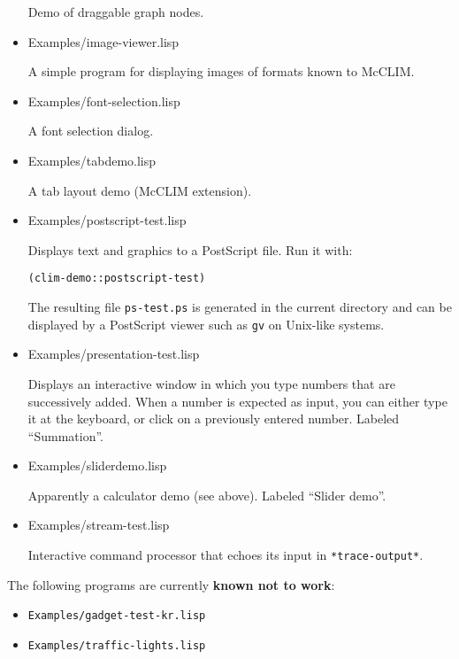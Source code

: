 \begin{itemize}
  Demo of draggable graph nodes.

\item Examples/image-viewer.lisp

  A simple program for displaying images of formats known to McCLIM.

\item Examples/font-selection.lisp

  A font selection dialog.

\item Examples/tabdemo.lisp

  A tab layout demo (McCLIM extension).

\item Examples/postscript-test.lisp

  Displays text and graphics to a PostScript file.  Run it with:

\begin{verbatim}
(clim-demo::postscript-test)
\end{verbatim}

  The resulting file \texttt{ps-test.ps} is generated in the current
  directory and can be displayed by a PostScript viewer such as
  \texttt{gv} on Unix-like systems.

\item Examples/presentation-test.lisp

  Displays an interactive window in which you type numbers that are
  successively added.  When a number is expected as input, you can
  either type it at the keyboard, or click on a previously entered
  number. Labeled ``Summation''.

\item Examples/sliderdemo.lisp

  Apparently a calculator demo (see above). Labeled ``Slider demo''.

\item Examples/stream-test.lisp

  Interactive command processor that echoes its input in
  \texttt{*trace-output*}.

\end{itemize}

The following programs are currently \textbf{known not to work}:
\begin{itemize}
\item
 \texttt{Examples/gadget-test-kr.lisp}
\item
 \texttt{Examples/traffic-lights.lisp}
\end{itemize}

